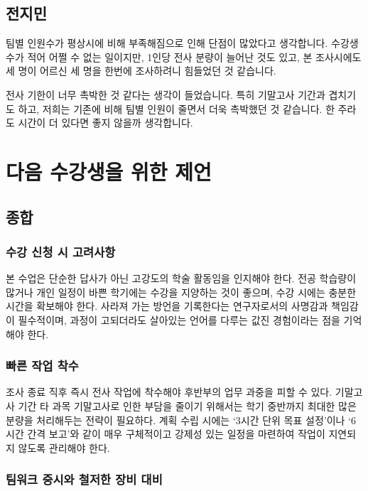 \subsection{전지민}

팀별 인원수가 평상시에 비해 부족해짐으로 인해 단점이 많았다고 생각합니다. 수강생 수가 적어 어쩔 수 없는 일이지만, 1인당 전사 분량이 늘어난 것도 있고, 본 조사시에도 세 명이 어르신 세 명을 한번에 조사하려니 힘들었던 것 같습니다. 

전사 기한이 너무 촉박한 것 같다는 생각이 들었습니다. 특히 기말고사 기간과 겹치기도 하고, 저희는 기존에 비해 팀별 인원이 줄면서 더욱 촉박했던 것 같습니다. 한 주라도 시간이 더 있다면 좋지 않을까 생각합니다.

\section{다음 수강생을 위한 제언}

\subsection{종합}

\subsubsection{수강 신청 시 고려사항}

본 수업은 단순한 답사가 아닌 고강도의 학술 활동임을 인지해야 한다. 전공 학습량이 많거나 개인 일정이 바쁜 학기에는 수강을 지양하는 것이 좋으며, 수강 시에는 충분한 시간을 확보해야 한다. 사라져 가는 방언을 기록한다는 연구자로서의 사명감과 책임감이 필수적이며, 과정이 고되더라도 살아있는 언어를 다루는 값진 경험이라는 점을 기억해야 한다.

\subsubsection{빠른 작업 착수}
조사 종료 직후 즉시 전사 작업에 착수해야 후반부의 업무 과중을 피할 수 있다. 기말고사 기간 타 과목 기말고사로 인한 부담을 줄이기 위해서는 학기 중반까지 최대한 많은 분량을 처리해두는 전략이 필요하다. 계획 수립 시에는 `3시간 단위 목표 설정'이나 `6시간 간격 보고'와 같이 매우 구체적이고 강제성 있는 일정을 마련하여 작업이 지연되지 않도록 관리해야 한다.

\subsubsection{팀워크 중시와 철저한 장비 대비}

